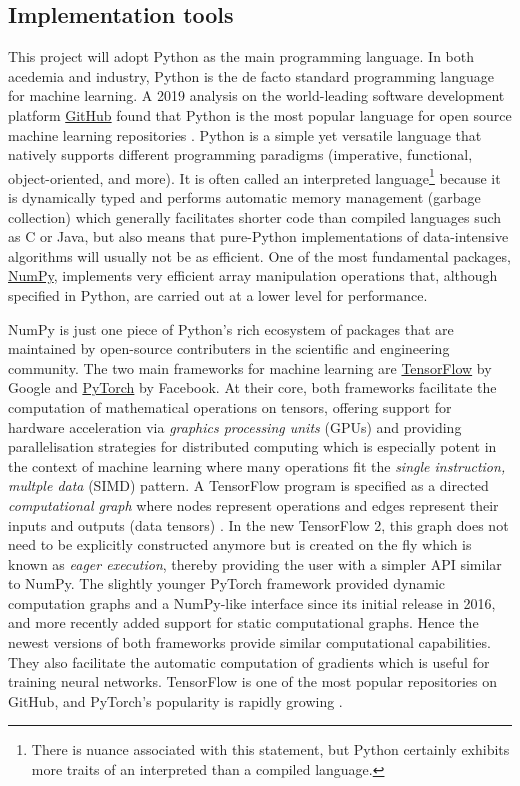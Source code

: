 \subsection{Implementation tools}
This project will adopt Python as the main programming language.
In both acedemia and industry, Python is the de facto standard programming language for machine learning. 
A 2019 analysis on the world-leading software development platform \href{https://www.github.com/}{GitHub} found that Python is the most popular language for open source machine learning repositories \cite{elliott2019}.
Python is a simple yet versatile language that natively supports different programming paradigms (imperative, functional, object-oriented, and more).
It is often called an interpreted language\footnote{There is nuance associated with this statement, but Python certainly exhibits more traits of an interpreted than a compiled language.} because it is dynamically typed and performs automatic memory management (garbage collection) which generally facilitates shorter code than compiled languages such as C or Java, but also means that pure-Python implementations of data-intensive algorithms will usually not be as efficient.
One of the most fundamental packages, \href{https://numpy.org/}{NumPy}, implements very efficient array manipulation operations that, although specified in Python, are carried out at a lower level for performance.

NumPy is just one piece of Python's rich ecosystem of packages that are maintained by open-source contributers in the scientific and engineering community.
The two main frameworks for machine learning are \href{https://www.tensorflow.org/}{TensorFlow} by Google and \href{https://www.pytorch.org/}{PyTorch} by Facebook. 
At their core, both frameworks facilitate the computation of mathematical operations on tensors, offering support for hardware acceleration via \textit{graphics processing units} (GPUs) and providing parallelisation strategies for distributed computing which is especially potent in the context of machine learning where many operations fit the \textit{single instruction, multple data} (SIMD) pattern.
A TensorFlow program is specified as a directed \textit{computational graph} where nodes represent operations and edges represent their inputs and outputs (data tensors) \cite{tensorflow2015whitepaper}.
In the new TensorFlow 2, this graph does not need to be explicitly constructed anymore but is created on the fly which is known as \textit{eager execution}, thereby providing the user with a simpler API similar to NumPy.
The slightly younger PyTorch framework provided dynamic computation graphs and a NumPy-like interface since its initial release in 2016, and more recently added support for static computational graphs.
Hence the newest versions of both frameworks provide similar computational capabilities.
They also facilitate the automatic computation of gradients which is useful for training neural networks. 
TensorFlow is one of the most popular repositories on GitHub, and PyTorch's popularity is rapidly growing \cite{github2019}.

